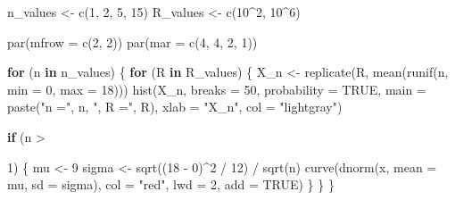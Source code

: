\documentclass[
]{article}
\newenvironment{Shaded}{}{}
\newcommand{\AttributeTok}[1]{\textcolor[rgb]{0.49,0.56,0.16}{#1}}
\newcommand{\ConstantTok}[1]{\textcolor[rgb]{0.53,0.00,0.00}{#1}}
\newcommand{\ControlFlowTok}[1]{\textcolor[rgb]{0.00,0.44,0.13}{\textbf{#1}}}
\newcommand{\DecValTok}[1]{\textcolor[rgb]{0.25,0.63,0.44}{#1}}
\newcommand{\FunctionTok}[1]{\textcolor[rgb]{0.02,0.16,0.49}{#1}}
\newcommand{\NormalTok}[1]{#1}
\newcommand{\OtherTok}[1]{\textcolor[rgb]{0.00,0.44,0.13}{#1}}
\newcommand{\SpecialCharTok}[1]{\textcolor[rgb]{0.25,0.44,0.63}{#1}}
\newcommand{\StringTok}[1]{\textcolor[rgb]{0.25,0.44,0.63}{#1}}
\begin{document}
\begin{Shaded}
\begin{Highlighting}[]
\NormalTok{n\_values }\OtherTok{\textless{}{-}} \FunctionTok{c}\NormalTok{(}\DecValTok{1}\NormalTok{, }\DecValTok{2}\NormalTok{, }\DecValTok{5}\NormalTok{, }\DecValTok{15}\NormalTok{)}
\NormalTok{R\_values }\OtherTok{\textless{}{-}} \FunctionTok{c}\NormalTok{(}\DecValTok{10}\SpecialCharTok{\^{}}\DecValTok{2}\NormalTok{, }\DecValTok{10}\SpecialCharTok{\^{}}\DecValTok{6}\NormalTok{)}

\FunctionTok{par}\NormalTok{(}\AttributeTok{mfrow =} \FunctionTok{c}\NormalTok{(}\DecValTok{2}\NormalTok{, }\DecValTok{2}\NormalTok{)) }
\FunctionTok{par}\NormalTok{(}\AttributeTok{mar =} \FunctionTok{c}\NormalTok{(}\DecValTok{4}\NormalTok{, }\DecValTok{4}\NormalTok{, }\DecValTok{2}\NormalTok{, }\DecValTok{1}\NormalTok{)) }

\ControlFlowTok{for}\NormalTok{ (n }\ControlFlowTok{in}\NormalTok{ n\_values) \{}
  \ControlFlowTok{for}\NormalTok{ (R }\ControlFlowTok{in}\NormalTok{ R\_values) \{}
\NormalTok{    X\_n }\OtherTok{\textless{}{-}} \FunctionTok{replicate}\NormalTok{(R, }\FunctionTok{mean}\NormalTok{(}\FunctionTok{runif}\NormalTok{(n, }\AttributeTok{min =} \DecValTok{0}\NormalTok{, }\AttributeTok{max =} \DecValTok{18}\NormalTok{)))}
    \FunctionTok{hist}\NormalTok{(X\_n, }\AttributeTok{breaks =} \DecValTok{50}\NormalTok{, }\AttributeTok{probability =} \ConstantTok{TRUE}\NormalTok{,}
         \AttributeTok{main =} \FunctionTok{paste}\NormalTok{(}\StringTok{"n ="}\NormalTok{, n, }\StringTok{", R ="}\NormalTok{, R),}
         \AttributeTok{xlab =} \StringTok{"X\_n"}\NormalTok{, }\AttributeTok{col =} \StringTok{"lightgray"}\NormalTok{)}
    
    \ControlFlowTok{if}\NormalTok{ (n }\SpecialCharTok{\textgreater{}}

 \DecValTok{1}\NormalTok{) \{}
\NormalTok{      mu }\OtherTok{\textless{}{-}} \DecValTok{9}  
\NormalTok{      sigma }\OtherTok{\textless{}{-}} \FunctionTok{sqrt}\NormalTok{((}\DecValTok{18} \SpecialCharTok{{-}} \DecValTok{0}\NormalTok{)}\SpecialCharTok{\^{}}\DecValTok{2} \SpecialCharTok{/} \DecValTok{12}\NormalTok{) }\SpecialCharTok{/} \FunctionTok{sqrt}\NormalTok{(n)  }
      \FunctionTok{curve}\NormalTok{(}\FunctionTok{dnorm}\NormalTok{(x, }\AttributeTok{mean =}\NormalTok{ mu, }\AttributeTok{sd =}\NormalTok{ sigma), }\AttributeTok{col =} \StringTok{"red"}\NormalTok{, }\AttributeTok{lwd =} \DecValTok{2}\NormalTok{, }\AttributeTok{add =} \ConstantTok{TRUE}\NormalTok{)}
\NormalTok{    \}}
\NormalTok{  \}}
\NormalTok{\}}
\end{Highlighting}
\end{Shaded}
\end{document}
